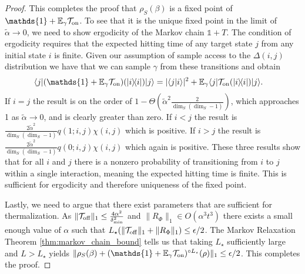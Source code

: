 \documentclass{article}
\newcommand{\on}{\rm on}
\newcommand{\off}{\rm off}
\newcommand{\ket}[1]{|#1\rangle}
\newcommand{\bra}[1]{\langle #1|}
\newcommand{\braket}[2]{\langle #1|#2\rangle}
\newcommand{\ketbra}[2]{| #1\rangle\! \langle #2|}
\newcommand{\norm}[1]{\| #1 \|}
\newcommand{\bigo}[1]{O\left(#1\right)}
\newcommand{\identity}{\mathds{1}}
\begin{document}
\begin{proof}
This completes the proof that $\rho_S(\beta)$ is a fixed point of $\identity + \mathbb{E}_{\gamma} \mathcal{T}_{\on}$. To see that it is the unique fixed point in the limit of $\tilde{\alpha}\rightarrow 0$, we need to show ergodicity of the Markov chain $\identity + T$. The condition of ergodicity requires that the expected hitting time of any target state $j$ from any initial state $i$ is finite. Given our assumption of sample access to the $\Delta(i,j)$ distribution we have that we can sample $\gamma$ from these transitions and obtain
\begin{align}
    \bra{j} (\identity + \mathbb{E}_{\gamma} \mathcal{T}_{\on})(\ketbra{i}{i}) \ket{j} &= |\braket{j}{i}|^2 + \mathbb{E}_{\gamma} \bra{j} \mathcal{T}_{\on} (\ketbra{i}{i}) \ket{j}.
\end{align}
If $i = j$ the result is on the order of $1 - \Theta(\widetilde{\alpha}^2 \frac{2}{\dim_S (\dim_S - 1)})$, which approaches 1 as $\widetilde{\alpha} \to 0$, and is clearly greater than zero. If $i < j$ the result is $\frac{2 \widetilde{\alpha}^2}{\dim_S (\dim_S - 1)} q(1; i,j) \chi(i,j)$ which is positive. If $i > j$ the result is $\frac{2 \widetilde{\alpha}^2}{\dim_S (\dim_S - 1)} q(0; i,j) \chi(i,j)$ which again is positive. These three results show that for all $i$ and $j$ there is a nonzero probability of transitioning from $i$ to $j$ within a single interaction, meaning the expected hitting time is finite. This is sufficient for ergodicity and therefore uniqueness of the fixed point.

Lastly, we need to argue that there exist parameters that are sufficient for thermalization. As $\norm{\mathcal{T}_{\off}}_1 \le \frac{4 \alpha^2}{\delta_{\min}^2}$ and $\norm{R_{\Phi}}_1 \in \bigo{\alpha^3 t^3}$ there exists a small enough value of $\alpha$ such that $L_{\star}(\norm{\mathcal{T}_{\off}}_1 + \norm{R_{\Phi}}_1) \le \epsilon / 2$. The Markov Relaxation Theorem \ref{thm:markov_chain_bound} tells us that taking $L_{\star}$ sufficiently large and $L>L_{\star}$ yields $\norm{\rho_S(\beta) + (\identity + \mathbb{E}_{\gamma} \mathcal{T}_{\on})^{\circ L_{\star}}(\rho)}_1 \le \epsilon /2$. This completes the proof.
\end{proof}
\end{document}
